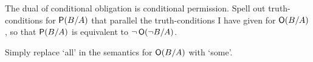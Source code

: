 
\begin{exercise}
  The dual of conditional obligation is conditional permission. Spell out
  truth-conditions for $\operatorname{\mathsf{P}}(B/A)$ that parallel the truth-conditions I have
  given for $\operatorname{\mathsf{O}}(B/A)$, so that $\operatorname{\mathsf{P}}(B/A)$ is equivalent to
  $\neg \operatorname{\mathsf{O}}(\neg B/A)$.
  


\end{exercise}
\begin{solution}
  Simply replace `all' in the semantics for $\operatorname{\mathsf{O}}(B/A)$ with `some'.
\end{solution}




